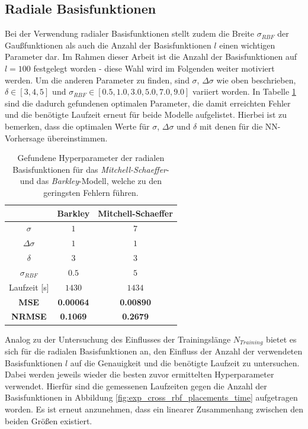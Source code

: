 \subsection{Radiale Basisfunktionen}
Bei der Verwendung radialer Basisfunktionen stellt zudem die Breite $\sigma_{RBF}$ der Gaußfunktionen als auch die Anzahl der Basisfunktionen $l$ einen wichtigen Parameter dar. Im Rahmen dieser Arbeit ist die Anzahl der Basisfunktionen auf $l=100$ festgelegt worden - diese Wahl wird im Folgenden weiter motiviert werden. Um die anderen Parameter zu finden, sind $\sigma$, $\Delta \sigma$ wie oben beschrieben, $\delta \in [3,4,5]$ und $\sigma_{RBF} \in [0.5, 1.0, 3.0, 5.0, 7.0, 9.0]$ variiert worden. In Tabelle \ref{tab:exp_cross_rbf_results} sind die dadurch gefundenen optimalen Parameter, die damit erreichten Fehler und die benötigte Laufzeit erneut für beide Modelle aufgelistet. Hierbei ist zu bemerken, dass die optimalen Werte für $\sigma$, $\Delta \sigma$ und $\delta$ mit denen für die NN-Vorhersage übereinstimmen. 

\begin{table}[h]
	\centering

	\begin{tabular}{|c|c|c|}
		\multicolumn{1}{c|}{} & Barkley & Mitchell-Schaeffer \\ 
		\hline \hline 
		\rule[-1ex]{0pt}{2.5ex} $\sigma$ & $1$ & $7$ \\ 
		\hline 
		\rule[-1ex]{0pt}{2.5ex} $\Delta \sigma$ & $1$ & $1$ \\ 
		\hline 
		\rule[-1ex]{0pt}{2.5ex} $\delta$ & $3$ & $3$ \\ 
		\hline 
		\rule[-1ex]{0pt}{2.5ex} $\sigma_{RBF}$ & $0.5$ & $5$ \\ 
		\hline 
		\rule[-1ex]{0pt}{2.5ex} Laufzeit [s] & $1430$ & $1434$ \\ 
		\hline 
		\rule[-1ex]{0pt}{2.5ex} \textbf{MSE} & \textbf{0.00064} & \textbf{0.00890} \\ 
		\hline 
		\rule[-1ex]{0pt}{2.5ex} \textbf{NRMSE} & \textbf{0.1069} & \textbf{0.2679} \\ 
		\hline 
	\end{tabular} 
	\caption{Gefundene Hyperparameter der radialen Basisfunktionen für das \textit{Mitchell-Schaeffer}- und das \textit{Barkley}-Modell, welche zu den geringsten Fehlern führen.}
	\label{tab:exp_cross_rbf_results}
\end{table} 

Analog zu der Untersuchung des Einflusses der Trainingslänge $N_{Training}$ bietet es sich für die radialen Basisfunktionen an, den Einfluss der Anzahl der verwendeten Basisfunktionen $l$ auf die Genauigkeit und die benötigte Laufzeit zu untersuchen. Dabei werden jeweils wieder die besten zuvor ermittelten Hyperparameter verwendet. Hierfür sind die gemessenen Laufzeiten gegen die Anzahl der Basisfunktionen in Abbildung \ref{fig:exp_cross_rbf_placements_time} aufgetragen worden. Es ist erneut anzunehmen, dass ein linearer Zusammenhang zwischen den beiden Größen existiert.

